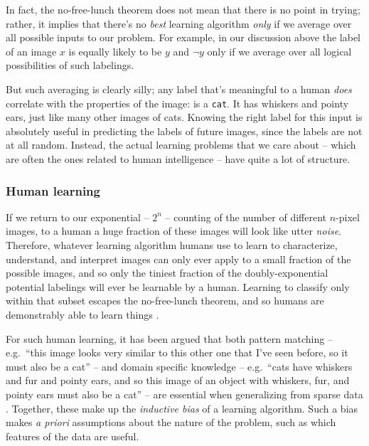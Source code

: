 \documentclass[12pt]{article}
\begin{document}
In fact, the no-free-lunch theorem does not mean that there is no point in trying; rather, it implies that there's no \emph{best} learning algorithm \emph{only} if we average over all possible inputs to our problem.
For example, in our discussion above the label of an image $x$ is equally likely to be $y$ and $\neg y$ only if we average over all logical possibilities of such labelings. 

But such averaging is clearly silly; any label that's meaningful to a human \emph{does} correlate with the properties of the image: \Cat is a \texttt{cat}. It has whiskers and pointy ears, just like many other images of cats. Knowing the right label for this input is absolutely useful in predicting the labels of future images, since the labels are not at all random. Instead, the actual learning problems that we care about -- which are often the ones related to human intelligence -- have quite a lot of structure.





\subsubsection*{Human learning}

If we return to our exponential -- $2^n$ -- counting of the number of different $n$-pixel images,
to a human a huge fraction of these images will look like utter \emph{noise}. 
Therefore, whatever learning algorithm humans use to learn to characterize, understand, and interpret images can only ever apply to a small fraction of the possible images, and so only the tiniest fraction of the doubly-exponential potential labelings will ever be learnable by a human. Learning to classify only within that subset escapes the no-free-lunch theorem, and so humans are demonstrably able to learn things \cite{gopnik1999scientist,griffiths2006optimal,vul2014one}.



For such human learning, it has been argued that both pattern matching -- e.g.~``this image looks very similar to this other one that I've seen before, so it must also be a cat'' -- and domain specific knowledge -- e.g.~``cats have whiskers and fur and pointy ears, and so this image of an object with whiskers, fur, and pointy ears must also be a cat'' -- are essential when generalizing from sparse data \cite{tenenbaum2006theory}. Together, these make up 
the \emph{inductive bias} of a learning algorithm.
Such a bias makes \emph{a priori} assumptions about the nature of the problem, such as which features of the data are useful.
\end{document}
